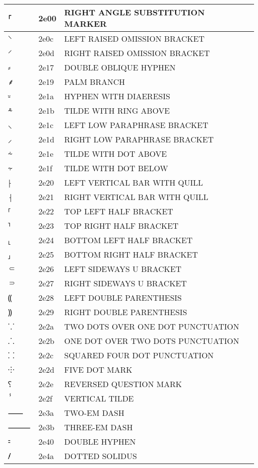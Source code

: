\documentclass[12pt,letterpaper,openany]{book}
\begin{document}
\begin{center}
\begin{supertabular}{|m{0.25in}|m{0.5in}|m{4in}|}
			⸀ & 2e00 & RIGHT ANGLE SUBSTITUTION MARKER\\\hline
			⸌ & 2e0c & LEFT RAISED OMISSION BRACKET\\\hline
			⸍ & 2e0d & RIGHT RAISED OMISSION BRACKET\\\hline
			⸗ & 2e17 & DOUBLE OBLIQUE HYPHEN\\\hline
			⸙ & 2e19 & PALM BRANCH\\\hline
			⸚ & 2e1a & HYPHEN WITH DIAERESIS\\\hline
			⸛ & 2e1b & TILDE WITH RING ABOVE\\\hline
			⸜ & 2e1c & LEFT LOW PARAPHRASE BRACKET\\\hline
			⸝ & 2e1d & RIGHT LOW PARAPHRASE BRACKET\\\hline
			⸞ & 2e1e & TILDE WITH DOT ABOVE\\\hline
			⸟ & 2e1f & TILDE WITH DOT BELOW\\\hline
			⸠ & 2e20 & LEFT VERTICAL BAR WITH QUILL\\\hline
			⸡ & 2e21 & RIGHT VERTICAL BAR WITH QUILL\\\hline
			⸢ & 2e22 & TOP LEFT HALF BRACKET\\\hline
			⸣ & 2e23 & TOP RIGHT HALF BRACKET\\\hline
			⸤ & 2e24 & BOTTOM LEFT HALF BRACKET\\\hline
			⸥ & 2e25 & BOTTOM RIGHT HALF BRACKET\\\hline
			⸦ & 2e26 & LEFT SIDEWAYS U BRACKET\\\hline
			⸧ & 2e27 & RIGHT SIDEWAYS U BRACKET\\\hline
			⸨ & 2e28 & LEFT DOUBLE PARENTHESIS\\\hline
			⸩ & 2e29 & RIGHT DOUBLE PARENTHESIS\\\hline
			⸪ & 2e2a & TWO DOTS OVER ONE DOT PUNCTUATION\\\hline
			⸫ & 2e2b & ONE DOT OVER TWO DOTS PUNCTUATION\\\hline
			⸬ & 2e2c & SQUARED FOUR DOT PUNCTUATION\\\hline
			⸭ & 2e2d & FIVE DOT MARK\\\hline
			⸮ & 2e2e & REVERSED QUESTION MARK\\\hline
			ⸯ & 2e2f & VERTICAL TILDE\\\hline
			⸺ & 2e3a & TWO-EM DASH\\\hline
			⸻ & 2e3b & THREE-EM DASH\\\hline
			⹀ & 2e40 & DOUBLE HYPHEN\\\hline
			⹊ & 2e4a & DOTTED SOLIDUS\\\hline

\end{supertabular}
\end{center}
\end{document}
